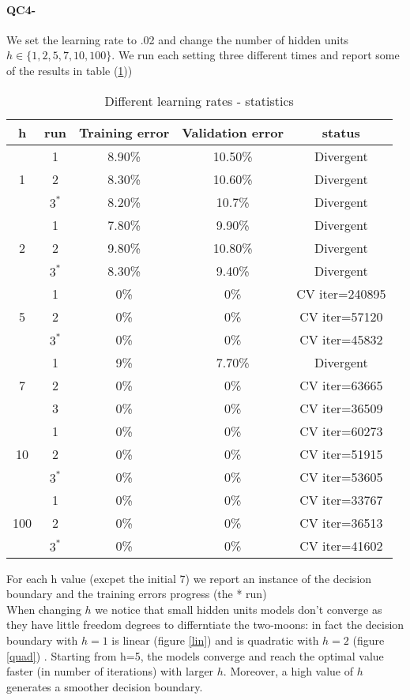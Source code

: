 \documentclass[11pt]{article}
\newcommand{\1}{\mathbbm{1}}
\newcommand{\0}{\mathbf{0}}
\begin{document}
	\paragraph{QC4-}
		We set the learning rate to .02 and change the number of hidden units $h\in\{1,2,5,7,10,100\}$. We run each setting three different times and report some of the results in table (\ref{stth}))
			\begin{table}[H]
			\centering
			\begin{tabular}{|c|c|c|c|c|}
			\hline
			h & run & Training error & Validation error & status\\
			\hline
			\multirow{3}{*}{1} &1& 8.90\% & 10.50\% & Divergent\\
							   &2& 8.30\% & 10.60\% & Divergent\\ 
							   &$3^*$& 8.20\% & 10.7\% & Divergent\\
			\hline
			\multirow{3}{*}{2} &1&  7.80\% & 9.90\% & Divergent\\ 
							    &2&  9.80\% & 10.80\% & Divergent\\ 
							    &$3^*$&  8.30\% & 9.40\% & Divergent\\
			\hline
			\multirow{3}{*}{5} &1& 0\% & 0\% & CV iter=240895\\ 
							     &2& 0\% & 0\% & CV iter=57120\\
							     &$3^*$& 0\% & 0\% & CV iter=45832\\
			\hline
			\multirow{3}{*}{7} &1& 9\% & 7.70\% & Divergent\\ 
						          &2& 0\% & 0\% & CV iter=63665 \\
						          &3& 0\% & 0\% & CV iter=36509 \\
			\hline
			\multirow{3}{*}{10} &1& 0\% & 0\% & CV iter=60273\\ 
						          &2& 0\% & 0\% & CV iter=51915 \\
						          &$3^*$& 0\% & 0\% & CV iter=53605 \\
			\hline	
			\multirow{3}{*}{100} &1& 0\% & 0\% & CV iter=33767\\ 
						          &2& 0\% & 0\% & CV iter=36513 \\
						          &$3^*$& 0\% & 0\% & CV iter=41602 \\
			\hline					     	
			\end{tabular}
			\caption{Different learning rates - statistics}\label{stth}		    
		\end{table}
		For each h value (excpet the initial 7) we report an instance of the decision boundary and the training errors progress (the * run)\\
		When changing $h$ we notice that small hidden units models don't converge as they have little freedom degrees to differntiate the two-moons: in fact the decision boundary with $h=1$ is linear (figure \ref{lin}) and is quadratic with $h=2$ (figure \ref{quad}) . Starting from h=5, the models converge and reach the optimal value faster (in number of iterations) with larger $h$. Moreover, a high value of $h$ generates a smoother decision boundary.
		
\end{document}
